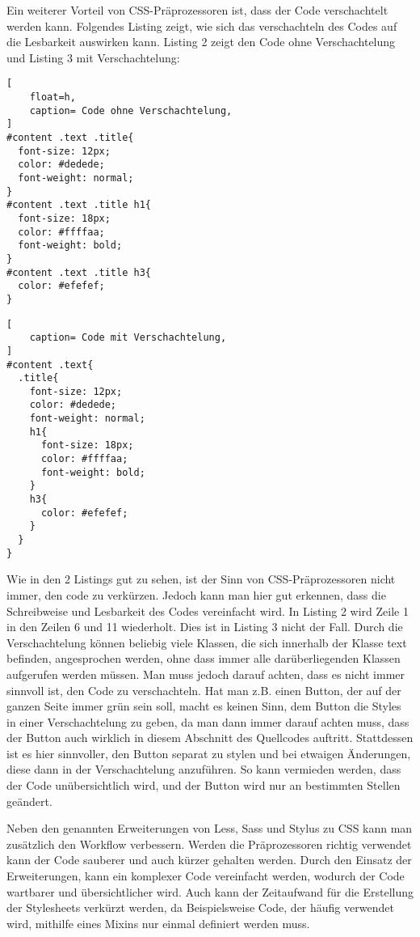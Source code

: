 Ein weiterer Vorteil von CSS-Präprozessoren ist, dass der Code verschachtelt werden kann. Folgendes Listing zeigt, wie sich das verschachteln des Codes auf die Lesbarkeit auswirken kann. Listing 2 zeigt den Code ohne Verschachtelung und Listing 3 mit Verschachtelung:\newline
\begin{lstlisting}[
	float=h,
	caption= Code ohne Verschachtelung,
]
#content .text .title{
  font-size: 12px;
  color: #dedede;
  font-weight: normal;
}
#content .text .title h1{
  font-size: 18px;
  color: #ffffaa;
  font-weight: bold;
}
#content .text .title h3{
  color: #efefef;
}
\end{lstlisting}

\begin{lstlisting}[
	caption= Code mit Verschachtelung,
]
#content .text{
  .title{
    font-size: 12px;
    color: #dedede;
    font-weight: normal;
    h1{
      font-size: 18px;
      color: #ffffaa;
      font-weight: bold;
    }
    h3{
      color: #efefef;
    }
  }
}
\end{lstlisting}

Wie in den 2 Listings gut zu sehen, ist der Sinn von CSS-Präprozessoren nicht immer, den code zu verkürzen. Jedoch kann man hier gut erkennen, dass die Schreibweise und Lesbarkeit des Codes vereinfacht wird. In Listing 2 wird Zeile 1 in den Zeilen 6 und 11 wiederholt. Dies ist in Listing 3 nicht der Fall. Durch die Verschachtelung können beliebig viele Klassen, die sich innerhalb der Klasse text befinden, angesprochen werden, ohne dass immer alle darüberliegenden Klassen aufgerufen werden müssen. \newline
Man muss jedoch darauf achten, dass es nicht immer sinnvoll ist, den Code zu verschachteln. Hat man z.B. einen Button, der auf der ganzen Seite immer grün sein soll, macht es keinen Sinn, dem Button die Styles in einer Verschachtelung zu geben, da man dann immer darauf achten muss, dass der Button auch wirklich in diesem Abschnitt des Quellcodes auftritt. Stattdessen ist es hier sinnvoller, den Button separat zu stylen und bei etwaigen Änderungen, diese dann in der Verschachtelung anzuführen. So kann vermieden werden, dass der Code unübersichtlich wird, und der Button wird nur an bestimmten Stellen geändert.

Neben den genannten Erweiterungen von Less, Sass und Stylus zu CSS kann man zusätzlich den Workflow verbessern. Werden die Präprozessoren richtig verwendet kann der Code sauberer und auch kürzer gehalten werden.\newline
Durch den Einsatz der Erweiterungen, kann ein komplexer Code vereinfacht werden, wodurch der Code wartbarer und übersichtlicher wird. Auch kann der Zeitaufwand für die Erstellung der Stylesheets verkürzt werden, da Beispielsweise Code, der häufig verwendet wird, mithilfe eines Mixins nur einmal definiert werden muss.

